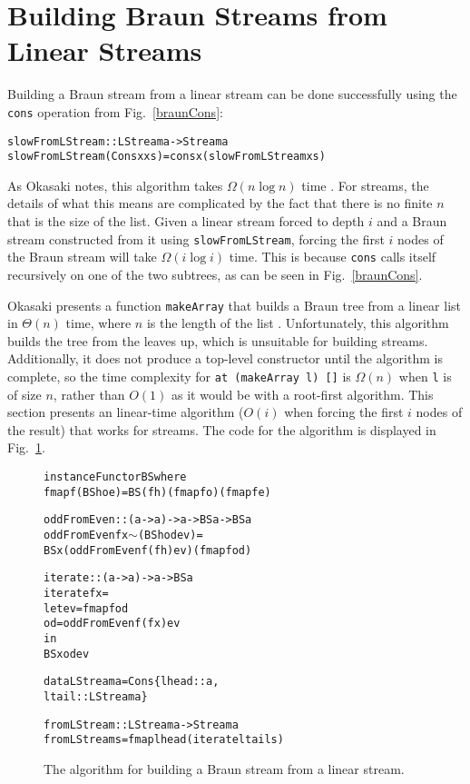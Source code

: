 \documentclass[envcountsect]{llncs}
\begin{document}
\section{Building Braun Streams from Linear Streams}
\label{iterSect}

Building a Braun stream from a linear stream can be done successfully using the {\tt cons} operation from Fig.~\ref{braunCons}:

\begin{alltt}
slowFromLStream :: LStream a -> Stream a
slowFromLStream (Cons x xs) = cons x (slowFromLStream xs)
\end{alltt}

As Okasaki notes, this algorithm takes $\Omega(n \log n)$ time \cite{okasakiBraun}.
For streams, the details of what this means are complicated by the fact that there is no finite $n$ that is the size of the list.
Given a linear stream forced to depth $i$ and a Braun stream constructed from it using {\tt slowFromLStream}, forcing the first $i$ nodes of the Braun stream will take $\Omega(i \log i)$ time.
This is because {\tt cons} calls itself recursively on one of the two subtrees, as can be seen in Fig.~\ref{braunCons}.

Okasaki presents a function {\tt makeArray} that builds a Braun tree from a linear list in $\Theta(n)$ time, where $n$ is the length of the list \cite{okasakiBraun}.
Unfortunately, this algorithm builds the tree from the leaves up, which is unsuitable for building streams.
Additionally, it does not produce a top-level constructor until the algorithm is complete, so the time complexity for {\tt at (makeArray l) []} is $\Omega(n)$ when {\tt l} is of size $n$, rather than $O(1)$ as it would be with a root-first algorithm.
This section presents an linear-time algorithm ($O(i)$ when forcing the first $i$ nodes of the result) that works for streams.
The code for the algorithm is displayed in Fig.~\ref{iterateCode}.

\begin{figure}
\begin{alltt}
instance Functor BS where
    fmap f (BS h o e) = BS (f h) (fmap f o) (fmap f e)

oddFromEven :: (a -> a) -> a -> BS a -> BS a
oddFromEven f x  \(\sim\)(BS h od ev) =
    BS x (oddFromEven f (f h) ev) (fmap f od)

iterate :: (a -> a) -> a -> BS a
iterate f x =
    let ev = fmap f od
        od = oddFromEven f (f x) ev
    in
      BS x od ev

data LStream a = Cons \{lhead::a,
                       ltail::LStream a\}

fromLStream :: LStream a -> Stream a
fromLStream s = fmap lhead (iterate ltail s)
\end{alltt}
\caption{The algorithm for building a Braun stream from a linear stream.}
\label{iterateCode}
\end{figure}
\end{document}
